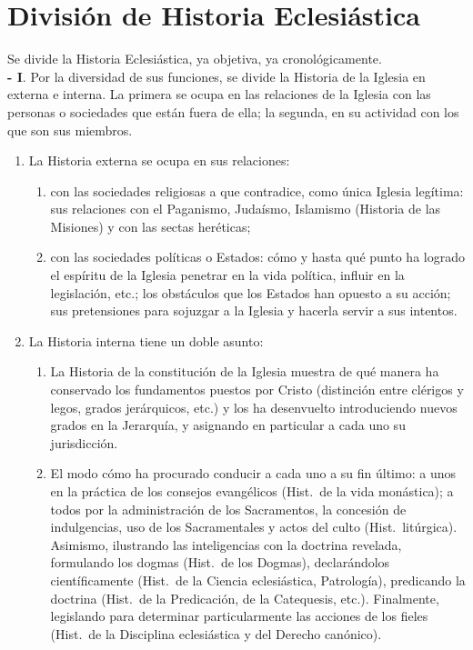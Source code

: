 \raggedbottom{} \documentclass[12pt, a4paper]{book}
\begin{document}
\section{División de Historia Eclesiástica}
Se divide la Historia Eclesiástica, ya objetiva, ya cronológicamente.\\
\textbf{- I}. Por la diversidad de sus funciones, se divide la Historia
de la Iglesia en externa e interna. La primera se ocupa en las relaciones de la Iglesia con las personas o sociedades que están fuera de ella; la segunda, en su actividad con los que son sus miembros.
\begin{enumerate}
  \item La Historia externa se ocupa en sus relaciones: \begin{enumerate}
          \item con las sociedades religiosas a que contradice, como única Iglesia legítima: sus relaciones con el Paganismo, Judaísmo, Islamismo (Historia de las Misiones) y con las sectas heréticas;
          \item con las sociedades políticas o Estados: cómo y hasta qué punto ha logrado el espíritu de la Iglesia penetrar en la vida política, influir en la legislación, etc.; los obstáculos que los Estados han opuesto a su acción; sus pretensiones para sojuzgar a la Iglesia y hacerla servir a sus intentos.
        \end{enumerate}
  \item La Historia interna tiene un doble asunto: \begin{enumerate}
          \item La Historia de la constitución de la Iglesia muestra de qué manera ha conservado los fundamentos puestos por Cristo (distinción entre clérigos y legos, grados jerárquicos, etc.) y los ha desenvuelto introduciendo nuevos grados en la Jerarquía, y asignando en particular a cada uno su jurisdicción.
          \item El modo cómo ha procurado conducir a cada uno a su fin último: a unos en la práctica de los consejos evangélicos (Hist.\ de la vida monástica); a todos por la administración de los Sacramentos, la concesión de indulgencias, uso de los Sacramentales y actos del culto (Hist.\ litúrgica). Asimismo, ilustrando las inteligencias con la doctrina revelada, formulando los dogmas (Hist.\ de los Dogmas), declarándolos científicamente (Hist.\ de la Ciencia eclesiástica, Patrología), predicando la doctrina (Hist.\ de la Predicación, de la Catequesis, etc.). Finalmente, legislando para determinar particularmente las acciones de los fieles (Hist.\ de la Disciplina eclesiástica y del Derecho canónico).

        \end{enumerate}
\end{enumerate}
\end{document}
